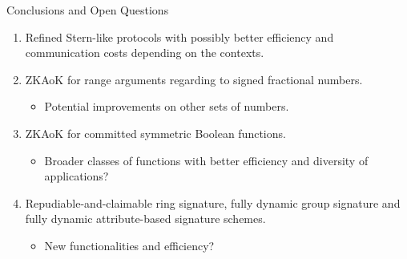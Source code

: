 \begin{frame}{Conclusions and Open Questions}
	\begin{enumerate}
		\item Refined Stern-like protocols with possibly better efficiency and communication costs depending on the contexts.\pause
		\item ZKAoK for range arguments regarding to signed fractional numbers.\pause
		\begin{itemize}
			\item Potential improvements on other sets of numbers.\pause
		\end{itemize}
		\item ZKAoK for committed symmetric Boolean functions.\pause
		\begin{itemize}
			\item Broader classes of functions with better efficiency and diversity of applications?\pause
		\end{itemize}
		\item Repudiable-and-claimable ring signature, fully dynamic group signature and fully dynamic attribute-based signature schemes.\pause
		\begin{itemize}
			\item New functionalities and efficiency?
		\end{itemize}
	\end{enumerate}
\end{frame}